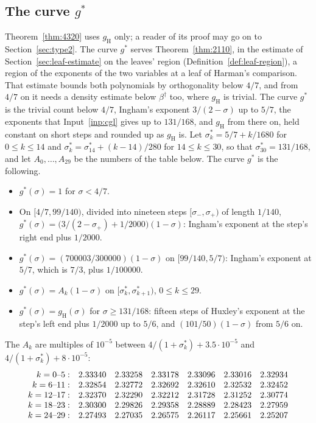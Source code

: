 \documentclass[11pt]{article}
\theoremstyle{definition}
\begin{document}
\subsection*{The curve \texorpdfstring{$g^*$}{g*}}

Theorem~\ref{thm:4320} uses $g_{\mathrm H}$ only; a reader of its proof may go on to Section~\ref{sec:type2}. The
curve $g^*$ serves Theorem~\ref{thm:2110}, in the estimate of Section~\ref{sec:leaf-estimate} on the leaves' region
(Definition~\ref{def:leaf-region}), a region of the exponents of the two variables at a leaf of Harman's comparison.
That estimate bounds both polynomials by orthogonality below $4/7$, and from $4/7$ on it needs a density estimate
below $\beta^\dagger$ too, where $g_{\mathrm H}$ is trivial. The curve $g^*$ is the trivial count below $4/7$,
Ingham's exponent $3/(2 - \sigma)$ up to $5/7$, the exponents that Input~\ref{inp:cgl} gives up to $131/168$, and
$g_{\mathrm H}$ from there on, held constant on short steps and rounded up as $g_{\mathrm H}$ is. Let $\sigma^*_k =
5/7 + k/1680$ for $0 \le k \le 14$ and
$\sigma^*_k = \sigma^*_{14} + (k - 14)/280$ for $14 \le k \le 30$, so that $\sigma^*_{30} = 131/168$, and let
$A_0, \dots, A_{29}$ be the numbers of the table below. The curve $g^*$ is the following.
\begin{itemize}
\item $g^*(\sigma) = 1$ for $\sigma < 4/7$.
\item On $[4/7, 99/140)$, divided into nineteen steps $[\sigma_-, \sigma_+)$ of length $1/140$,
  $g^*(\sigma) = \bigl(3/(2 - \sigma_+) + 1/2000\bigr)(1 - \sigma)$: Ingham's exponent at the step's right end plus
  $1/2000$.
\item $g^*(\sigma) = (700003/300000)(1 - \sigma)$ on $[99/140, 5/7)$: Ingham's exponent at $5/7$, which is $7/3$, plus
  $1/100000$.
\item $g^*(\sigma) = A_k(1 - \sigma)$ on $[\sigma^*_k, \sigma^*_{k+1})$, $0 \le k \le 29$.
\item $g^*(\sigma) = g_{\mathrm H}(\sigma)$ for $\sigma \ge 131/168$: fifteen steps of Huxley's exponent at the step's
  left end plus $1/2000$ up to $5/6$, and $(101/50)(1 - \sigma)$ from $5/6$ on.
\end{itemize}
The $A_k$ are multiples of $10^{-5}$ between $4/(1 + \sigma^*_k) + 3.5 \cdot 10^{-5}$ and
$4/(1 + \sigma^*_k) + 8 \cdot 10^{-5}$:
\[
\begin{array}{r@{\quad}llllll}
k = 0\text{--}5:   & 2.33340 & 2.33258 & 2.33178 & 2.33096 & 2.33016 & 2.32934 \\
k = 6\text{--}11:  & 2.32854 & 2.32772 & 2.32692 & 2.32610 & 2.32532 & 2.32452 \\
k = 12\text{--}17: & 2.32370 & 2.32290 & 2.32212 & 2.31728 & 2.31252 & 2.30774 \\
k = 18\text{--}23: & 2.30300 & 2.29826 & 2.29358 & 2.28889 & 2.28423 & 2.27959 \\
k = 24\text{--}29: & 2.27493 & 2.27035 & 2.26575 & 2.26117 & 2.25661 & 2.25207
\end{array}
\]
\end{document}
